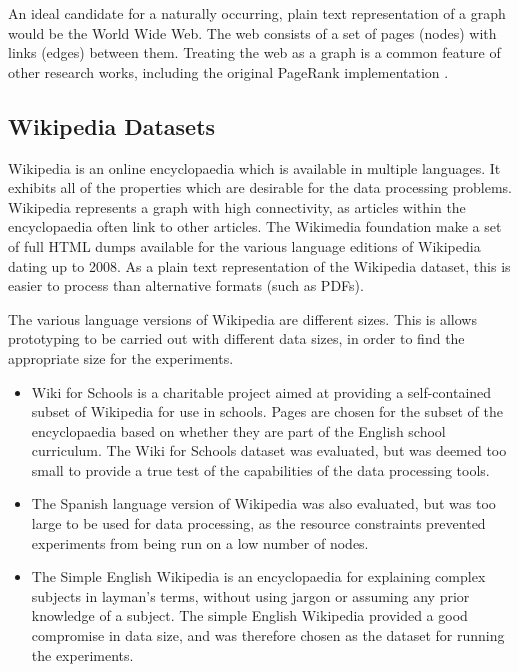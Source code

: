 An ideal candidate for a naturally occurring, plain text representation of a graph would be the World Wide Web. The web consists of a set of pages (nodes) with links (edges) between them. Treating the web as a graph is a common feature of other research works, including the original PageRank implementation \cite{page1999pagerank}.

\subsection{Wikipedia Datasets}
Wikipedia is an online encyclopaedia which is available in multiple languages. It exhibits all of the properties which are desirable for the data processing problems. Wikipedia represents a graph with high connectivity, as articles within the encyclopaedia often link to other articles. The Wikimedia foundation make a set of full HTML dumps available for the various language editions of Wikipedia dating up to 2008. As a plain text representation of the Wikipedia dataset, this is easier to process than alternative formats (such as PDFs). 

The various language versions of Wikipedia are different sizes. This is allows prototyping to be carried out with different data sizes, in order to find the appropriate size for the experiments.

\begin{itemize}
	\item Wiki for Schools is a charitable project aimed at providing a self-contained subset of Wikipedia for use in schools. Pages are chosen for the subset of the encyclopaedia based on whether they are part of the English school curriculum. The Wiki for Schools dataset was evaluated, but was deemed too small to provide a true test of the capabilities of the data processing tools.
	\item The Spanish language version of Wikipedia was also evaluated, but was too large to be used for data processing, as the resource constraints prevented experiments from being run on a low number of nodes.
	\item The Simple English Wikipedia is an encyclopaedia for explaining complex subjects in layman's terms, without using jargon or assuming any prior knowledge of a subject. The simple English Wikipedia provided a good compromise in data size, and was therefore chosen as the dataset for running the experiments.
\end{itemize}

